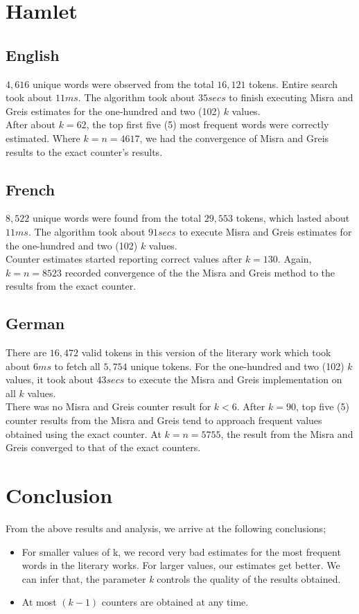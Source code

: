\documentclass[longpaper, english, final, times]{revdetua}
\begin{document}
	\section{Hamlet}
		\subsection{English}
			$4,616$ unique words were observed from the total $16,121$ tokens. Entire search took about $11 ms$. The algorithm took about $35 secs$ to finish executing Misra and Greis estimates for the one-hundred and two (102) $k$ values.\\
			
			After about $k=62$, the top first five (5) most frequent words were correctly estimated. Where $k=n=4617$, we had the convergence of Misra and Greis results to the exact counter's results.
			
		\subsection{French}
			$8,522$ unique words were found from the total $29,553$ tokens, which lasted about $11 ms$. The algorithm took about $91 secs$ to execute Misra and Greis estimates for the one-hundred and two (102) $k$ values.\\
			
			Counter estimates started reporting correct values after $k=130$. Again, $k=n=8523$ recorded convergence of the the Misra and Greis method to the results from the exact counter.
			
		\subsection{German}
			There are $16,472$ valid tokens in this version of the literary work which took about $6 ms$ to fetch all $5,754$ unique tokens. For the one-hundred and two (102) $k$ values, it took about $43 secs$ to execute the Misra and Greis implementation on all $k$ values.\\
			
			There was no Misra and Greis counter result for $k<6$. After $k=90$, top five (5) counter results from the Misra and Greis tend to approach frequent values obtained using the exact counter. At $k=n=5755$, the result from the Misra and Greis converged to that of the exact counters.
		
	\section{Conclusion}
		From the above results and analysis, we arrive at the following conclusions;
		\begin{itemize}
			\setlength\itemsep{1em}
			\item For smaller values of k, we record very bad estimates for the most frequent words in the literary works. For larger values, our estimates get better. We can infer that, the parameter \textit{k} controls the quality of the results obtained.
			\item At most $(k-1)$ counters are obtained at any time.
		\end{itemize}
		
	
\end{document}
